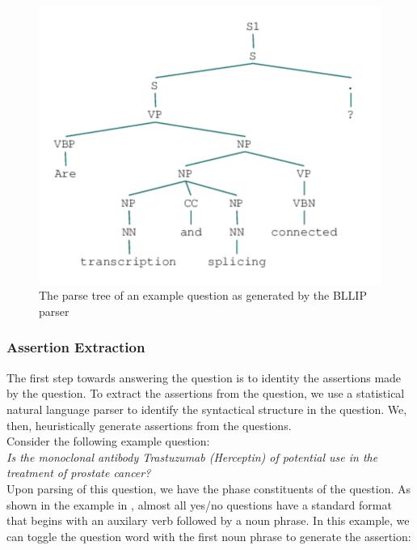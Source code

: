 \documentclass[11pt,a4paper]{article}
\begin{document}
\begin{figure}
    \centering
    \includegraphics[scale=0.5]{images/question_parse.png}
    \caption{The parse tree of an example question as generated by the BLLIP parser}
    \label{fig:parse_tree}
\end{figure}

\subsubsection{Assertion Extraction}

The first step towards answering the question is to identity the assertions made by the question. To extract the assertions from the question, we use a statistical natural language parser to identify the syntactical structure in the question. We, then, heuristically generate assertions from the questions.\\
Consider the following example question: \\

\textit{Is the monoclonal antibody Trastuzumab (Herceptin) of potential use in the treatment of prostate cancer?} \\

Upon parsing of this question, we have the phase constituents of the question. As shown in the example in \label{fig:parse_tree}, almost all yes/no questions have a standard format that begins with an auxilary verb followed by a noun phrase. In this example, we can toggle the question word with the first noun phrase to generate the assertion: \\
\end{document}
